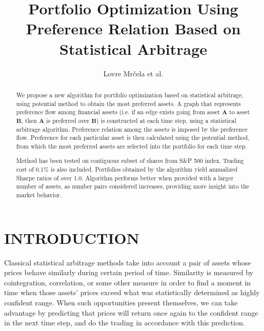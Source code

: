 \documentclass[letterpaper, 10pt, conference]{ieeeconf}
\title{\LARGE \bf Portfolio Optimization Using Preference Relation Based on Statistical Arbitrage}
\author{Lovre Mr\v{c}ela et al.}
\begin{document}
  \maketitle
  \thispagestyle{empty}
  \pagestyle{empty}
    
  \begin{abstract}
    
  We propose a new algorithm for portfolio optimization based on statistical arbitrage, using potential method to obtain the most preferred assets.
  A graph that represents preference flow among financial assets (i.e. if an edge exists going from asset $\mathbold{A}$ to asset $\mathbold{B}$, then $\mathbold{A}$ is preferred over $\mathbold{B}$) is constructed at each time step, using a statistical arbitrage algorithm.
  Preference relation among the assets is imposed by the preference flow.
  Preference for each particular asset is then calculated using the potential method\cite{caklovic}, from which the most preferred assets are selected into the portfolio for each time step.
  
  Method has been tested on contiguous subset of shares from S\&P 500 index.
  Trading cost of 0.1\% is also included.
  Portfolios obtained by the algorithm yield annualized Sharpe ratios of over 1.0.
  Algorithm performs better when provided with a larger number of assets, as number pairs considered increases, providing more insight into the market behavior.
  
  \end{abstract}
  
  \section{INTRODUCTION}
  
  
  Classical statistical arbitrage methods take into account a pair of assets whose prices behave similarly during certain period of time.
  Similarity is measured by cointegration, correlation, or some other measure in order to find a moment in time when those assets' prices exceed what was statistically determined as highly confident range.
  When such opportunities present themselves, we can take advantage by predicting that prices will return once again to the confident range in the next time step, and do the trading in accordance with this prediction.
  
\end{document}
